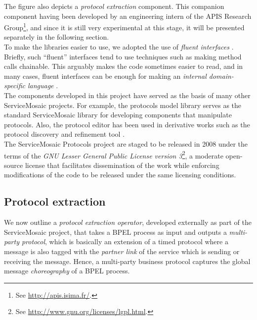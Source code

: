 The figure also depicts a \emph{protocol extraction} component. This companion component having been developed by an engineering intern of the APIS Research Group\footnote{See \url{http://apis.isima.fr/}.}, and since it is still very experimental at this stage, it will be presented separately in the following section.\\

To make the libraries easier to use, we adopted the use of \emph{fluent interfaces} \cite{FowlerFI05}. Briefly, such ``fluent'' interfaces tend to use techniques such as making method calls chainable. This arguably makes the code sometimes easier to read, and in many cases, fluent interfaces can be enough for making an \emph{internal domain-specific language} \cite{FreemanP06,FowlerDSL04}. \\

The components developed in this project have served as the basis of many other ServiceMosaic projects. For example, the protocols model library serves as the standard ServiceMosaic library for developing components that manipulate protocols. Also, the protocol editor has been used in derivative works such as the protocol discovery and refinement tool \cite{Motahari-NezhadSBC07}.\\

The ServiceMosaic Protocols project are staged to be released in 2008 under the terms of the \emph{GNU Lesser General Public License version 3}\footnote{See \url{http://www.gnu.org/licenses/lgpl.html}.}, a moderate open-source license that facilitates dissemination of the work while enforcing modifications of the code to be released under the same licensing conditions.


\subsection{Protocol extraction}


We now outline a \emph{protocol extraction operator}, developed externally as part of the ServiceMosaic project, that takes a BPEL process as input and outputs a \emph{multi-party protocol}, which is basically an extension of a timed protocol where a message is also tagged with the \emph{partner link} of the service which is sending or receiving the message.
Hence, a multi-party business protocol captures the global message \emph{choreography} of a BPEL process.\\

